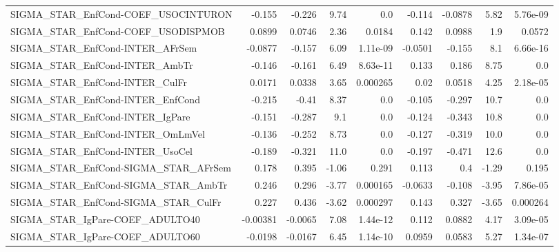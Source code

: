 \begin{tabular}{lrrrrrrrr}
SIGMA\_STAR\_EnfCond-COEF\_USOCINTURON   &      -0.155 &       -0.226 &     9.74 &      0.0 &     -0.114 &     -0.0878 &         5.82 &      5.76e-09 \\
SIGMA\_STAR\_EnfCond-COEF\_USODISPMOB    &      0.0899 &       0.0746 &     2.36 &   0.0184 &      0.142 &      0.0988 &          1.9 &        0.0572 \\
SIGMA\_STAR\_EnfCond-INTER\_AFrSem       &     -0.0877 &       -0.157 &     6.09 & 1.11e-09 &    -0.0501 &      -0.155 &          8.1 &      6.66e-16 \\
SIGMA\_STAR\_EnfCond-INTER\_AmbTr        &      -0.146 &       -0.161 &     6.49 & 8.63e-11 &      0.133 &       0.186 &         8.75 &           0.0 \\
SIGMA\_STAR\_EnfCond-INTER\_CulFr        &      0.0171 &       0.0338 &     3.65 & 0.000265 &       0.02 &      0.0518 &         4.25 &      2.18e-05 \\
SIGMA\_STAR\_EnfCond-INTER\_EnfCond      &      -0.215 &        -0.41 &     8.37 &      0.0 &     -0.105 &      -0.297 &         10.7 &           0.0 \\
SIGMA\_STAR\_EnfCond-INTER\_IgPare       &      -0.151 &       -0.287 &      9.1 &      0.0 &     -0.124 &      -0.343 &         10.8 &           0.0 \\
SIGMA\_STAR\_EnfCond-INTER\_OmLmVel      &      -0.136 &       -0.252 &     8.73 &      0.0 &     -0.127 &      -0.319 &         10.0 &           0.0 \\
SIGMA\_STAR\_EnfCond-INTER\_UsoCel       &      -0.189 &       -0.321 &     11.0 &      0.0 &     -0.197 &      -0.471 &         12.6 &           0.0 \\
SIGMA\_STAR\_EnfCond-SIGMA\_STAR\_AFrSem  &       0.178 &        0.395 &    -1.06 &    0.291 &      0.113 &         0.4 &        -1.29 &         0.195 \\
SIGMA\_STAR\_EnfCond-SIGMA\_STAR\_AmbTr   &       0.246 &        0.296 &    -3.77 & 0.000165 &    -0.0633 &      -0.108 &        -3.95 &      7.86e-05 \\
SIGMA\_STAR\_EnfCond-SIGMA\_STAR\_CulFr   &       0.227 &        0.436 &    -3.62 & 0.000297 &      0.143 &       0.327 &        -3.65 &      0.000264 \\
SIGMA\_STAR\_IgPare-COEF\_ADULTO40       &    -0.00381 &      -0.0065 &     7.08 & 1.44e-12 &      0.112 &      0.0882 &         4.17 &      3.09e-05 \\
SIGMA\_STAR\_IgPare-COEF\_ADULTO60       &     -0.0198 &      -0.0167 &     6.45 & 1.14e-10 &     0.0959 &      0.0583 &         5.27 &      1.34e-07 \\

\end{tabular}
